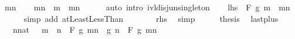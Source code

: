 \begin{isabellebody}
\ mn\isanewline
\ \ \isamarkupfalse%
\ {\isachardoublequoteopen}{\isacharbraceleft}{\kern0pt}m{\isachardot}{\kern0pt}{\isachardot}{\kern0pt}n{\isacharbraceright}{\kern0pt}\ {\isacharequal}{\kern0pt}\ {\isacharbraceleft}{\kern0pt}m{\isacharbraceright}{\kern0pt}\ {\isasymunion}\ {\isacharbraceleft}{\kern0pt}m{\isacharless}{\kern0pt}{\isachardot}{\kern0pt}{\isachardot}{\kern0pt}n{\isacharbraceright}{\kern0pt}{\isachardoublequoteclose}\isanewline
\ \ \ \ \isamarkupfalse%
\ {\isacharparenleft}{\kern0pt}auto\ intro{\isacharcolon}{\kern0pt}\ ivl{\isacharunderscore}{\kern0pt}disj{\isacharunderscore}{\kern0pt}un{\isacharunderscore}{\kern0pt}singleton{\isacharparenright}{\kern0pt}\isanewline
\ \ \isamarkupfalse%
\ {\isachardoublequoteopen}{\isacharquery}{\kern0pt}lhs\ {\isacharequal}{\kern0pt}\ F\ g\ {\isacharparenleft}{\kern0pt}{\isacharbraceleft}{\kern0pt}m{\isacharbraceright}{\kern0pt}\ {\isasymunion}\ {\isacharbraceleft}{\kern0pt}m{\isacharless}{\kern0pt}{\isachardot}{\kern0pt}{\isachardot}{\kern0pt}n{\isacharbraceright}{\kern0pt}{\isacharparenright}{\kern0pt}{\isachardoublequoteclose}\isanewline
\ \ \ \ \isamarkupfalse%
\ {\isacharparenleft}{\kern0pt}simp\ add{\isacharcolon}{\kern0pt}\ atLeast{}LessThan{\isacharparenright}{\kern0pt}\isanewline
\ \ \isamarkupfalse%
\ \isamarkupfalse%
\ {\isachardoublequoteopen}{\isasymdots}\ {\isacharequal}{\kern0pt}\ {\isacharquery}{\kern0pt}rhs{\isachardoublequoteclose}\ \isamarkupfalse%
\ simp\isanewline
\ \ \isamarkupfalse%
\ \isamarkupfalse%
\ {\isacharquery}{\kern0pt}thesis\ \isacommand{{\isachardot}{\kern0pt}}\isamarkupfalse%
\isanewline
{}\isamarkupfalse%
%
\endisatagproof
{\isafoldproof}%
%
\isadelimproof
\isanewline
%
\endisadelimproof
\isanewline
{}\isamarkupfalse%
\ last{\isacharunderscore}{\kern0pt}plus{\isacharcolon}{\kern0pt}\ \isanewline
\ \ \ n{\isacharcolon}{\kern0pt}{\isacharcolon}{\kern0pt}nat\ \ \ {\isachardoublequoteopen}m\ {\isasymle}\ n\ {\isasymLongrightarrow}\ F\ g\ {\isacharbraceleft}{\kern0pt}m{\isachardot}{\kern0pt}{\isachardot}{\kern0pt}n{\isacharbraceright}{\kern0pt}\ {\isacharequal}{\kern0pt}\ g\ n\ \isactrlbold {\isacharasterisk}{\kern0pt}\ F\ g\ {\isacharbraceleft}{\kern0pt}m{\isachardot}{\kern0pt}{\isachardot}{\kern0pt}{\isacharless}{\kern0pt}n{\isacharbraceright}{\kern0pt}{\isachardoublequoteclose}\isanewline
%
\isadelimproof
\ \ %
\endisadelimproof
%
\isatagproof
{}\isamarkupfalse%

\end{isabellebody}

